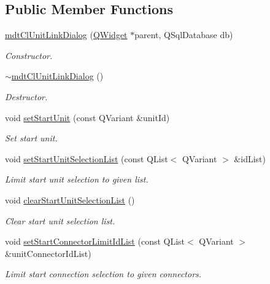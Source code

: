 \subsection*{Public Member Functions}
\begin{DoxyCompactItemize}
\item 
\hyperlink{classmdt_cl_unit_link_dialog_aecb541b458e86006bb5ba8b6d5b6fafb}{mdt\-Cl\-Unit\-Link\-Dialog} (\hyperlink{class_q_widget}{Q\-Widget} $\ast$parent, Q\-Sql\-Database db)
\begin{DoxyCompactList}\small\item\em Constructor. \end{DoxyCompactList}\item 
\hyperlink{classmdt_cl_unit_link_dialog_a0a77f250456330ba367cab406d0312d8}{$\sim$mdt\-Cl\-Unit\-Link\-Dialog} ()
\begin{DoxyCompactList}\small\item\em Destructor. \end{DoxyCompactList}\item 
void \hyperlink{classmdt_cl_unit_link_dialog_afca17028440970a898b9dcd3c1ad6923}{set\-Start\-Unit} (const Q\-Variant \&unit\-Id)
\begin{DoxyCompactList}\small\item\em Set start unit. \end{DoxyCompactList}\item 
void \hyperlink{classmdt_cl_unit_link_dialog_a0d94d403b47dca98652d80af5a7c0ba6}{set\-Start\-Unit\-Selection\-List} (const Q\-List$<$ Q\-Variant $>$ \&id\-List)
\begin{DoxyCompactList}\small\item\em Limit start unit selection to given list. \end{DoxyCompactList}\item 
void \hyperlink{classmdt_cl_unit_link_dialog_ae0225a00bae8b719bee96cfaf0b5d6ce}{clear\-Start\-Unit\-Selection\-List} ()
\begin{DoxyCompactList}\small\item\em Clear start unit selection list. \end{DoxyCompactList}\item 
void \hyperlink{classmdt_cl_unit_link_dialog_abb795a510d75a3214618100174a3c395}{set\-Start\-Connector\-Limit\-Id\-List} (const Q\-List$<$ Q\-Variant $>$ \&unit\-Connector\-Id\-List)
\begin{DoxyCompactList}\small\item\em Limit start connection selection to given connectors. \end{DoxyCompactList}\item 

\end{DoxyCompactItemize}
